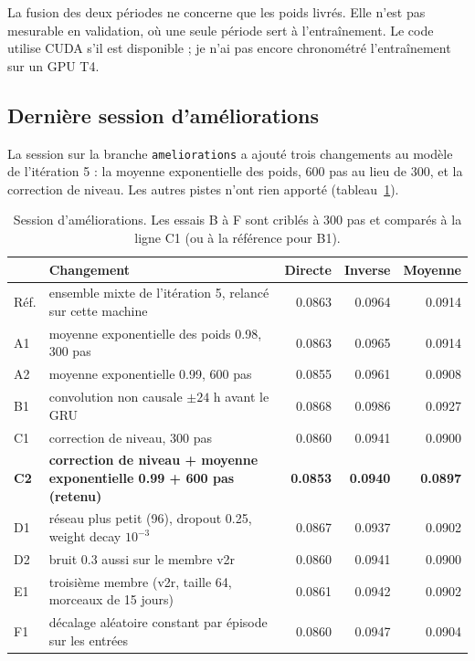 \documentclass[11pt,a4paper]{article}
\newcommand{\code}[1]{\texttt{#1}}
\begin{document}
La fusion des deux périodes ne concerne que les poids livrés. Elle n'est pas mesurable en validation, où une seule période sert à l'entraînement. Le code utilise CUDA s'il est disponible ; je n'ai pas encore chronométré l'entraînement sur un GPU T4.

\subsection{Dernière session d'améliorations}

La session sur la branche \code{ameliorations} a ajouté trois changements au modèle de l'itération 5 : la moyenne exponentielle des poids, 600 pas au lieu de 300, et la correction de niveau. Les autres pistes n'ont rien apporté (tableau~\ref{tab:session}).

\begin{table}[!htb]
\centering\small
\caption{Session d'améliorations. Les essais B à F sont criblés à 300 pas et comparés à la ligne C1 (ou à la référence pour B1).}
\label{tab:session}
\begin{tabularx}{\linewidth}{l X r r r}
\toprule
 & Changement & Directe & Inverse & Moyenne \\
\midrule
Réf. & ensemble mixte de l'itération 5, relancé sur cette machine & 0.0863 & 0.0964 & 0.0914 \\
A1 & moyenne exponentielle des poids 0.98, 300 pas & 0.0863 & 0.0965 & 0.0914 \\
A2 & moyenne exponentielle 0.99, 600 pas & 0.0855 & 0.0961 & 0.0908 \\
B1 & convolution non causale $\pm 24$ h avant le GRU & 0.0868 & 0.0986 & 0.0927 \\
C1 & correction de niveau, 300 pas & 0.0860 & 0.0941 & 0.0900 \\
\rowcolor{fond} \textbf{C2} & \textbf{correction de niveau + moyenne exponentielle 0.99 + 600 pas (retenu)} & \textbf{0.0853} & \textbf{0.0940} & \textbf{0.0897} \\
D1 & réseau plus petit (96), dropout 0.25, weight decay $10^{-3}$ & 0.0867 & 0.0937 & 0.0902 \\
D2 & bruit 0.3 aussi sur le membre v2r & 0.0860 & 0.0941 & 0.0900 \\
E1 & troisième membre (v2r, taille 64, morceaux de 15 jours) & 0.0861 & 0.0942 & 0.0902 \\
F1 & décalage aléatoire constant par épisode sur les entrées & 0.0860 & 0.0947 & 0.0904 \\
\bottomrule
\end{tabularx}
\end{table}
\end{document}
